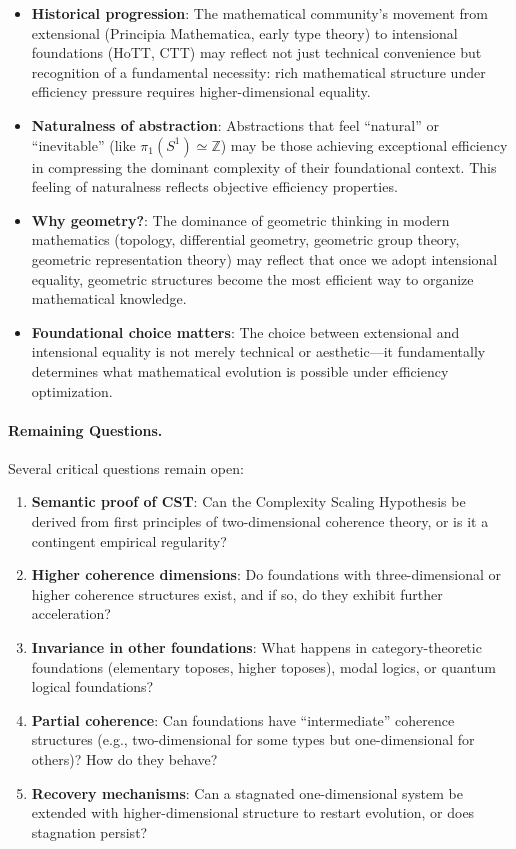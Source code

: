 \documentclass[11pt]{article}
\theoremstyle{definition}
\theoremstyle{remark}
\begin{document}
\begin{itemize}
\item \textbf{Historical progression}: The mathematical community's movement from extensional (Principia Mathematica, early type theory) to intensional foundations (HoTT, CTT) may reflect not just technical convenience but recognition of a fundamental necessity: rich mathematical structure under efficiency pressure requires higher-dimensional equality.

\item \textbf{Naturalness of abstraction}: Abstractions that feel ``natural'' or ``inevitable'' (like $\pi_1(S^1) \simeq \mathbb{Z}$) may be those achieving exceptional efficiency in compressing the dominant complexity of their foundational context. This feeling of naturalness reflects objective efficiency properties.

\item \textbf{Why geometry?}: The dominance of geometric thinking in modern mathematics (topology, differential geometry, geometric group theory, geometric representation theory) may reflect that once we adopt intensional equality, geometric structures become the most efficient way to organize mathematical knowledge.

\item \textbf{Foundational choice matters}: The choice between extensional and intensional equality is not merely technical or aesthetic---it fundamentally determines what mathematical evolution is possible under efficiency optimization.
\end{itemize}

\paragraph{Remaining Questions.}

Several critical questions remain open:

\begin{enumerate}
\item \textbf{Semantic proof of CST}: Can the Complexity Scaling Hypothesis be derived from first principles of two-dimensional coherence theory, or is it a contingent empirical regularity?

\item \textbf{Higher coherence dimensions}: Do foundations with three-dimensional or higher coherence structures exist, and if so, do they exhibit further acceleration?

\item \textbf{Invariance in other foundations}: What happens in category-theoretic foundations (elementary toposes, higher toposes), modal logics, or quantum logical foundations?

\item \textbf{Partial coherence}: Can foundations have ``intermediate'' coherence structures (e.g., two-dimensional for some types but one-dimensional for others)? How do they behave?

\item \textbf{Recovery mechanisms}: Can a stagnated one-dimensional system be extended with higher-dimensional structure to restart evolution, or does stagnation persist?
\end{enumerate}
\end{document}
